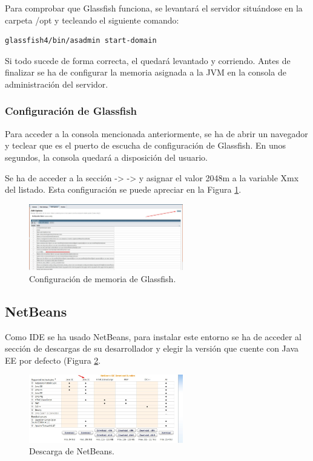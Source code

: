 Para comprobar que Glassfish funciona, se levantará el servidor situándose en la carpeta /opt y tecleando el siguiente comando:
\begin{lstlisting}[language=bash]
	glassfish4/bin/asadmin start-domain
\end{lstlisting}

Si todo sucede de forma correcta, el  quedará levantado y corriendo. Antes de finalizar se ha de configurar la memoria asignada a la JVM en la consola de administración del servidor.

\subsubsection{Configuración de Glassfish}
Para acceder a la consola mencionada anteriormente, se ha de abrir un navegador y teclear  que es el puerto de escucha de configuración de Glassfish. En unos segundos, la consola quedará a disposición del usuario.

Se ha de acceder a la sección  ->  ->  y asignar el valor 2048m a la variable Xmx del listado. Esta configuración se puede apreciar en la Figura \ref{glassconfig}.

\begin{figure}[h]
  \centering
    \includegraphics[width=0.6\textwidth]{../img/instalacion/glassconfig.jpg}
  \caption{Configuración de memoria de Glassfish.}
  \label{glassconfig}
\end{figure}

\subsection{NetBeans}
Como IDE se ha usado NetBeans, para instalar este entorno se ha de acceder al sección de descargas de su desarrollador y elegir la versión que cuente con Java EE por defecto (Figura \ref{descnet}.

\begin{figure}[h]
  \centering
    \includegraphics[width=0.6\textwidth]{../img/instalacion/descnet.jpg}
  \caption{Descarga de NetBeans.}
  \label{descnet}
\end{figure}


